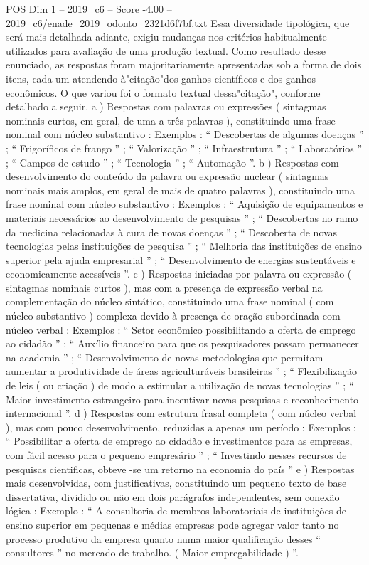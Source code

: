 \begin{textsample}{POS Dim 1 – 2019\_c6 – Score -4.00 – 2019\_c6/enade\_2019\_odonto\_2321d6f7bf.txt}
Essa diversidade tipológica, que será mais detalhada adiante, exigiu mudanças nos critérios habitualmente utilizados para avaliação de uma produção textual.
Como resultado desse enunciado, as respostas foram majoritariamente apresentadas sob a forma de dois itens, cada um atendendo à"citação"dos ganhos científicos e dos ganhos econômicos.
O que variou foi o formato textual dessa"citação", conforme detalhado a seguir. a ) Respostas com palavras ou expressões ( sintagmas nominais curtos, em geral, de uma a três palavras ), constituindo uma frase nominal com núcleo substantivo : Exemplos : “ Descobertas de algumas doenças ” ; “ Frigoríficos de frango ” ; “ Valorização ” ; “ Infraestrutura ” ; “ Laboratórios ” ; “ Campos de estudo ” ; “ Tecnologia ” ; “ Automação ”. b ) Respostas com desenvolvimento do conteúdo da palavra ou expressão nuclear ( sintagmas nominais mais amplos, em geral de mais de quatro palavras ), constituindo uma frase nominal com núcleo substantivo : Exemplos : “ Aquisição de equipamentos e materiais necessários ao desenvolvimento de pesquisas ” ; “ Descobertas no ramo da medicina relacionadas à cura de novas doenças ” ; “ Descoberta de novas tecnologias pelas instituições de pesquisa ” ; “ Melhoria das instituições de ensino superior pela ajuda empresarial ” ; “ Desenvolvimento de energias sustentáveis e economicamente acessíveis ”. c ) Respostas iniciadas por palavra ou expressão ( sintagmas nominais curtos ), mas com a presença de expressão verbal na complementação do núcleo sintático, constituindo uma frase nominal ( com núcleo substantivo ) complexa devido à presença de oração subordinada com núcleo verbal : Exemplos : “ Setor econômico possibilitando a oferta de emprego ao cidadão ” ; “ Auxílio financeiro para que os pesquisadores possam permanecer na academia ” ; “ Desenvolvimento de novas metodologias que permitam aumentar a produtividade de áreas agriculturáveis brasileiras ” ; “ Flexibilização de leis ( ou criação ) de modo a estimular a utilização de novas tecnologias ” ; “ Maior investimento estrangeiro para incentivar novas pesquisas e reconhecimento internacional ”. d ) Respostas com estrutura frasal completa ( com núcleo verbal ), mas com pouco desenvolvimento, reduzidas a apenas um período : Exemplos : “ Possibilitar a oferta de emprego ao cidadão e investimentos para as empresas, com fácil acesso para o pequeno empresário ” ; “ Investindo nesses recursos de pesquisas cientificas, obteve -se um retorno na economia do país ” e ) Respostas mais desenvolvidas, com justificativas, constituindo um pequeno texto de base dissertativa, dividido ou não em dois parágrafos independentes, sem conexão lógica : Exemplo : “ A consultoria de membros laboratoriais de instituições de ensino superior em pequenas e médias empresas pode agregar valor tanto no processo produtivo da empresa quanto numa maior qualificação desses “ consultores ” no mercado de trabalho. ( Maior empregabilidade ) ”.

\end{textsample}
